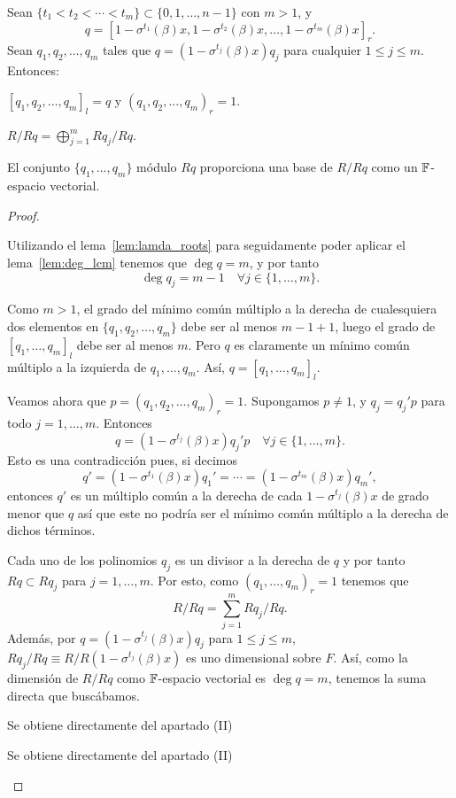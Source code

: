 \begin{lemma}
\label{lem:direct-sum}
    Sean \(\{t_1 < t_2 < \cdots < t_m \} \subset \{0, 1, \dots, n-1 \}\) con \(m > 1\), y
     \[
    q = {[1 - \sigma^{t_1}(\beta)x, 1 - \sigma^{t_2}(\beta)x, \ldots, 1 - \sigma^{t_m}(\beta)x]}_r
    .\]
    Sean \(q_1, q_2, \ldots, q_m\) tales que \(q = (1 - \sigma^{t_j}(\beta)x)q_j\) para cualquier \(1 \le j \le m\). Entonces:
\begin{nlist}
    \item \({[q_1, q_2, \ldots, q_m]}_l = q\) y \({(q_1, q_2, \ldots, q_m)}_r = 1\).
    \item \(R/Rq = \bigoplus_{j = 1}^{m} Rq_j/Rq\).
    \item El conjunto \(\{q_1, \ldots, q_m\}\) módulo \(Rq\) proporciona una base de  \(R/Rq\) como un \(\mathbb{F}\)-espacio vectorial.
\end{nlist}
\end{lemma}

\begin{proof}
\begin{nlist}
    \item Utilizando el lema~\ref{lem:lamda_roots} para seguidamente poder aplicar el lema~\ref{lem:deg_lcm} tenemos que \(\deg q = m\), y por tanto
    \[
    \deg q_j = m-1 \quad \forall j \in \{1, \ldots, m\}.
    \]

    Como \(m > 1\), el grado del mínimo común múltiplo a la derecha de cualesquiera dos elementos en \(\{q_1, q_2, \ldots, q_m\}\) debe ser al menos \(m - 1 + 1\), luego el grado de  \({[q_1, \ldots, q_m]}_l\) debe ser al menos \(m\). Pero \(q\) es claramente un mínimo común múltiplo a la izquierda de  \(q_1, \ldots, q_m\). Así, \(q = {[q_1, \ldots, q_m]}_l \).

Veamos ahora que \(p = {(q_1, q_2, \ldots, q_m)}_r = 1\). Supongamos \(p \neq 1\), y  \(q_j = q_j'p\) para todo \(j = 1, \ldots, m\). Entonces
\[
q = (1 - \sigma^{t_j}(\beta)x)q_j'p \quad \forall j \in \{1, \ldots, m\}
.\]
Esto es una contradicción pues, si decimos
\[
q' = (1 - \sigma^{t_1}(\beta)x)q_1' = \cdots = (1 - \sigma^{t_m}(\beta)x)q_m'
,\]
entonces \(q'\) es un múltiplo común a la derecha de cada \(1 - \sigma^{t_j}(\beta)x\) de grado menor que \(q\) así que este no podría ser el mínimo común múltiplo a la derecha de dichos términos.
    \item Cada uno de los polinomios \(q_j\) es un divisor a la derecha de \(q\) y por tanto \(Rq \subset Rq_j\) para \(j = 1, \ldots, m\). Por esto, como \({(q_1, \ldots, q_m)}_r = 1\) tenemos que
    \[
    R/Rq = \sum_{j=1}^{m} Rq_j/Rq
    .\]
Además, por \(q = (1 - \sigma^{t_j}(\beta)x)q_j\) para \(1 \le j \le m\),  \(Rq_j / Rq \equiv R / R(1-\sigma^{t_j}(\beta)x)\) es uno dimensional sobre \(F\). Así, como la dimensión de \(R / Rq\) como  \(\mathbb{F}\)-espacio vectorial es  \(\deg q = m\), tenemos la suma directa que buscábamos.

    \item Se obtiene directamente del apartado (II)
    \item Se obtiene directamente del apartado (II)
\end{nlist}
\end{proof}

